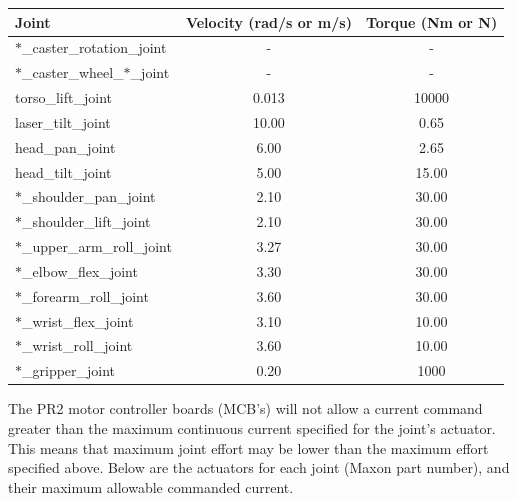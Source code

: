 \begin{tabular}{l*{2}{c}}
Joint  & Velocity (rad/s or m/s) & Torque (Nm or N) \\
\hline \hline
$\ast$\_caster\_rotation\_joint        & -     & -  \\
$\ast$\_caster\_wheel\_$\ast$\_joint   & -     & -  \\
torso\_lift\_joint                     & 0.013 & 10000 \\
laser\_tilt\_joint                     & 10.00 & 0.65  \\
head\_pan\_joint                       & 6.00  & 2.65  \\
head\_tilt\_joint                      & 5.00  & 15.00 \\
$\ast$\_shoulder\_pan\_joint           & 2.10  & 30.00 \\
$\ast$\_shoulder\_lift\_joint          & 2.10  & 30.00 \\
$\ast$\_upper\_arm\_roll\_joint        & 3.27  & 30.00 \\
$\ast$\_elbow\_flex\_joint             & 3.30  & 30.00 \\
$\ast$\_forearm\_roll\_joint           & 3.60  & 30.00 \\
$\ast$\_wrist\_flex\_joint             & 3.10  & 10.00 \\
$\ast$\_wrist\_roll\_joint             & 3.60  & 10.00 \\
$\ast$\_gripper\_joint                 & 0.20  & 1000  \\
\end{tabular}

The PR2 motor controller boards (MCB's) will not allow a current command greater
than the maximum continuous current specified for the joint's actuator. This
means that maximum joint effort may be lower than the maximum effort specified
above. Below are the actuators for each joint (Maxon part number), and their
maximum allowable commanded current.

